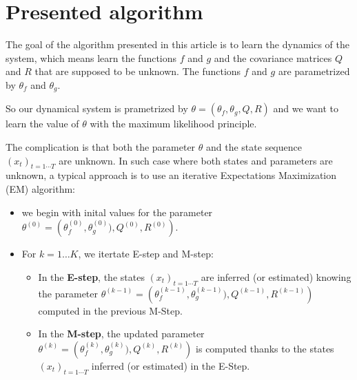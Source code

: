 
\section{Presented algorithm}

The goal of the algorithm presented in this article is to learn the dynamics of the system, which means learn the functions $f$ and $g$  and the covariance matrices $Q$ and $R$ that are supposed to be unknown.
The functions $f$ and $g$ are parametrized by $\theta_f$ and $\theta_g$.

So our dynamical system is prametrized by $\theta = \left(\theta_f, \theta_g, Q, R \right)$ and we want to learn the value of $\theta$ with the maximum likelihood principle.

The complication is that both the parameter $\theta$ and the state sequence $(x_t)_{t=1 \cdots T}$ are unknown.
In such case where both states and parameters are unknown, a typical approach is to use an iterative Expectations Maximization (EM) algorithm:
\begin{itemize}
  \item we begin with inital values for the parameter $\theta^{(0)} = \left( \theta_f^{(0)}, \theta_g^{(0)}), Q^{(0)}, R^{(0)} \right)$.
\item For $k=1 \ldots K$, we itertate E-step and M-step:
  \begin{itemize}
    \item In the \textbf{E-step}, the states $(x_t)_{t=1 \cdots T}$ are inferred (or estimated) knowing the parameter $\theta^{(k-1)} = \left( \theta_f^{(k-1)}, \theta_g^{(k-1)}), Q^{(k-1)}, R^{(k-1)} \right)$ computed in the previous M-Step.
    \item In the \textbf{M-step}, the updated parameter $\theta^{(k)} = \left( \theta_f^{(k)}, \theta_g^{(k)}), Q^{(k)}, R^{(k)} \right)$ is computed thanks to the states $(x_t)_{t=1 \cdots T}$ inferred (or estimated) in the E-Step.
  \end{itemize}
\end{itemize}
